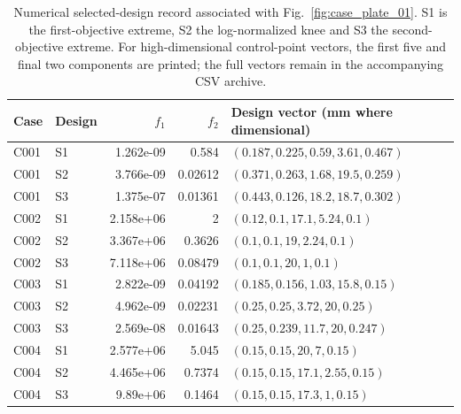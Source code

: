 \begin{table}[p]
\centering\scriptsize
\caption{Numerical selected-design record associated with Fig.~\ref{fig:case_plate_01}. S1 is the first-objective extreme, S2 the log-normalized knee and S3 the second-objective extreme. For high-dimensional control-point vectors, the first five and final two components are printed; the full vectors remain in the accompanying CSV archive.}
\label{tab:case_plate_01}
\setlength{\tabcolsep}{3.2pt}
\begin{tabularx}{\textwidth}{llrr>{\raggedright\arraybackslash}X}
\toprule Case & Design & $f_1$ & $f_2$ & Design vector (mm where dimensional) \\
\midrule
C001 & S1 & 1.262e-09 & 0.584 & $(0.187, 0.225, 0.59, 3.61, 0.467)$ \\
C001 & S2 & 3.766e-09 & 0.02612 & $(0.371, 0.263, 1.68, 19.5, 0.259)$ \\
C001 & S3 & 1.375e-07 & 0.01361 & $(0.443, 0.126, 18.2, 18.7, 0.302)$ \\
C002 & S1 & 2.158e+06 & 2 & $(0.12, 0.1, 17.1, 5.24, 0.1)$ \\
C002 & S2 & 3.367e+06 & 0.3626 & $(0.1, 0.1, 19, 2.24, 0.1)$ \\
C002 & S3 & 7.118e+06 & 0.08479 & $(0.1, 0.1, 20, 1, 0.1)$ \\
C003 & S1 & 2.822e-09 & 0.04192 & $(0.185, 0.156, 1.03, 15.8, 0.15)$ \\
C003 & S2 & 4.962e-09 & 0.02231 & $(0.25, 0.25, 3.72, 20, 0.25)$ \\
C003 & S3 & 2.569e-08 & 0.01643 & $(0.25, 0.239, 11.7, 20, 0.247)$ \\
C004 & S1 & 2.577e+06 & 5.045 & $(0.15, 0.15, 20, 7, 0.15)$ \\
C004 & S2 & 4.465e+06 & 0.7374 & $(0.15, 0.15, 17.1, 2.55, 0.15)$ \\
C004 & S3 & 9.89e+06 & 0.1464 & $(0.15, 0.15, 17.3, 1, 0.15)$ \\
\bottomrule
\end{tabularx}
\end{table}
